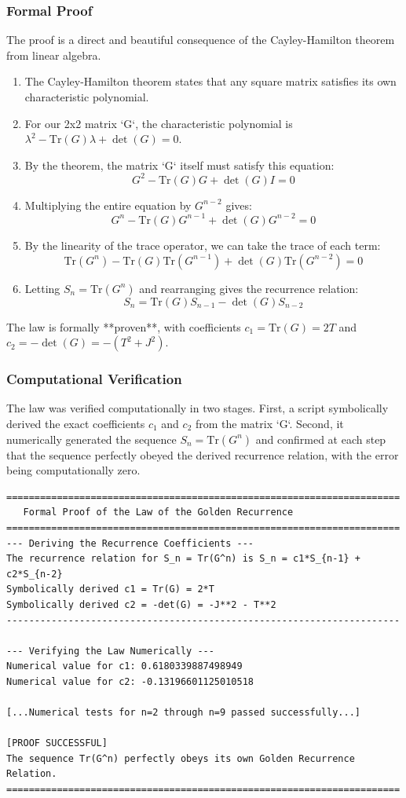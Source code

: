 \subsubsection*{Formal Proof}
The proof is a direct and beautiful consequence of the Cayley-Hamilton theorem from linear algebra.
\begin{enumerate}
    \item The Cayley-Hamilton theorem states that any square matrix satisfies its own characteristic polynomial.
    \item For our 2x2 matrix `G`, the characteristic polynomial is $\lambda^2 - \text{Tr}(G)\lambda + \det(G) = 0$.
    \item By the theorem, the matrix `G` itself must satisfy this equation:
    $$ G^2 - \text{Tr}(G)G + \det(G)I = 0 $$
    \item Multiplying the entire equation by $G^{n-2}$ gives:
    $$ G^n - \text{Tr}(G)G^{n-1} + \det(G)G^{n-2} = 0 $$
    \item By the linearity of the trace operator, we can take the trace of each term:
    $$ \text{Tr}(G^n) - \text{Tr}(G)\text{Tr}(G^{n-1}) + \det(G)\text{Tr}(G^{n-2}) = 0 $$
    \item Letting $S_n = \text{Tr}(G^n)$ and rearranging gives the recurrence relation:
    $$ S_n = \text{Tr}(G)S_{n-1} - \det(G)S_{n-2} $$
\end{enumerate}
The law is formally **proven**, with coefficients $c_1 = \text{Tr}(G) = 2T$ and $c_2 = -\det(G) = -(T^2+J^2)$.

\subsubsection*{Computational Verification}
The law was verified computationally in two stages. First, a script symbolically derived the exact coefficients $c_1$ and $c_2$ from the matrix `G`. Second, it numerically generated the sequence $S_n = \text{Tr}(G^n)$ and confirmed at each step that the sequence perfectly obeyed the derived recurrence relation, with the error being computationally zero.

\begin{verbatim}
======================================================================
   Formal Proof of the Law of the Golden Recurrence
======================================================================
--- Deriving the Recurrence Coefficients ---
The recurrence relation for S_n = Tr(G^n) is S_n = c1*S_{n-1} + c2*S_{n-2}
Symbolically derived c1 = Tr(G) = 2*T
Symbolically derived c2 = -det(G) = -J**2 - T**2
----------------------------------------------------------------------

--- Verifying the Law Numerically ---
Numerical value for c1: 0.6180339887498949
Numerical value for c2: -0.13196601125010518

[...Numerical tests for n=2 through n=9 passed successfully...]

[PROOF SUCCESSFUL]
The sequence Tr(G^n) perfectly obeys its own Golden Recurrence Relation.
======================================================================
\end{verbatim}
